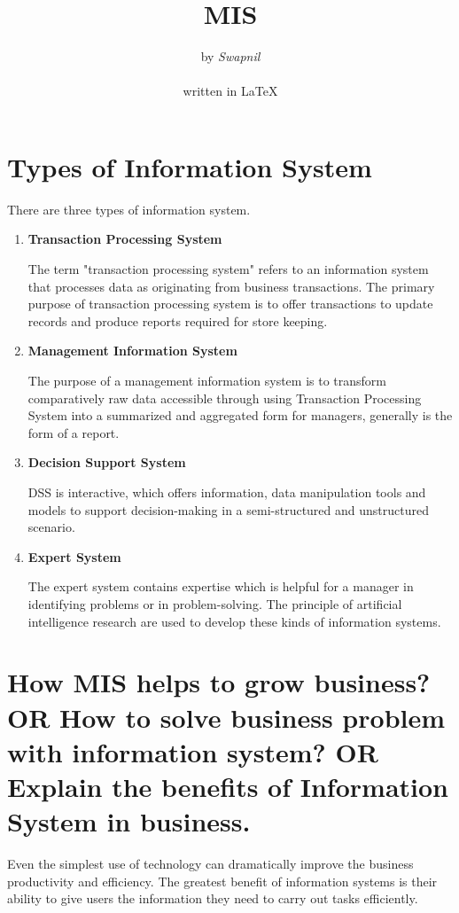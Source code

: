 \documentclass[10pt]{article}
\title{\Huge{MIS}}
\author{by \LARGE{\emph{Swapnil}}\\ \ \\ written in {\LaTeX}}
\begin{document}
\maketitle
\large

\section{Types of Information System}
There are three types of information system.
\begin{enumerate}
  \item \textbf{Transaction Processing System}

    The term "transaction processing system" refers to an information system that 
    processes data as originating from business transactions. The primary purpose 
    of transaction processing system is to offer transactions to update records 
    and produce reports required for store keeping.

  \item \textbf{Management Information System}

    The purpose of a management information system is to transform comparatively 
    raw data accessible through using Transaction Processing System into a summarized
    and aggregated form for managers, generally is the form of a report.

  \item \textbf{Decision Support System}

    DSS is interactive, which offers information, data manipulation tools and models
    to support decision-making in a semi-structured and unstructured scenario.

  \item \textbf{Expert System}

    The expert system contains expertise which is helpful for a manager in identifying
    problems or in problem-solving. The principle of artificial intelligence research 
    are used to develop these kinds of information systems.

\end{enumerate}


\section{How MIS helps to grow business? OR How to solve business problem with 
information system? OR Explain the benefits of Information System in business.}
Even the simplest use of technology can dramatically improve the business productivity
and efficiency. The greatest benefit of information systems is their ability to give 
users the information they need to carry out tasks efficiently.
\end{document}
